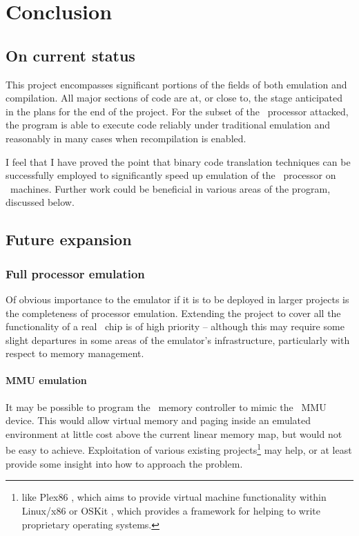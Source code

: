 \chapter{Conclusion}

\section{On current status}

This project encompasses significant portions of the fields of both emulation and compilation. All major sections of code are at, or close to, the stage anticipated in the plans for the end of the project. For the subset of the \arm\ processor attacked, the program is able to execute code reliably under traditional emulation and reasonably in many cases when recompilation is enabled.

I feel that I have proved the point that binary code translation techniques can be successfully employed to significantly speed up emulation of the \arm\ processor on \ia\ machines. Further work could be beneficial in various areas of the program, discussed below.

\section{Future expansion}

\subsection{Full processor emulation}

Of obvious importance to the emulator if it is to be deployed in larger projects is the completeness of processor emulation. Extending the project to cover all the functionality of a real \arm\ chip is of high priority -- although this may require some slight departures in some areas of the emulator's infrastructure, particularly with respect to memory management.

\subsubsection{MMU emulation}

It may be possible to program the \ia\ memory controller to mimic the \arm\ MMU device. This would allow virtual memory and paging inside an emulated environment at little cost above the current linear memory map, but would not be easy to achieve. Exploitation of various existing projects\footnote{like Plex86 \cite{Plex86}, which aims to provide virtual machine functionality within Linux/x86 or OSKit \cite{OSKit}, which provides a framework for helping to write proprietary operating systems.} may help, or at least provide some insight into how to approach the problem.

